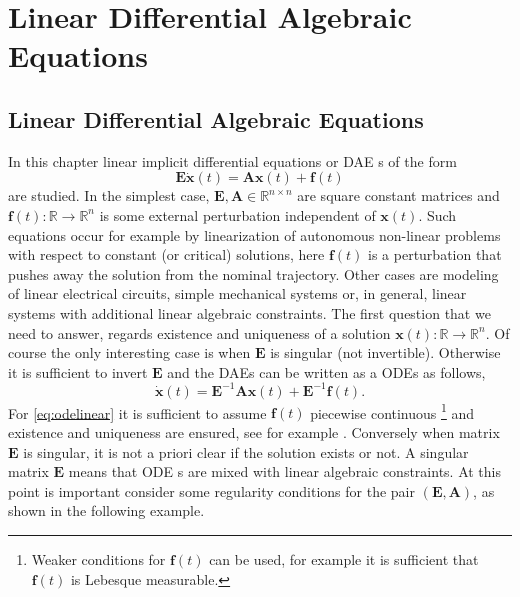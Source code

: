 %
%

\chapter{Linear Differential Algebraic Equations}
	\label{ch:linearDAE}
	\section{Linear Differential Algebraic Equations}
		In this chapter linear implicit differential equations or DAE s of the form
		\begin{equation}
			\label{eq:daelinear}
			\bm{E}\dot{\bm{x}}(t) = \bm{A}\bm{x}(t)+\bm{f}(t)
		\end{equation}
		are studied.
		In the simplest case, $\bm{E},\bm{A}\in\mathbb{R}^{n\times n}$
		are square constant matrices and $\bm{f}(t):\mathbb{R}\rightarrow\mathbb{R}^{n}$
		is some external perturbation independent of $\bm{x}(t)$.
		Such equations occur for example by linearization of autonomous
		non-linear problems with respect to constant (or critical) solutions,
		here $\bm{f}(t)$ is a perturbation that pushes away the solution
		from the nominal trajectory. Other cases are modeling of  linear electrical circuits,
		simple mechanical systems or, in general, 
		linear systems with additional linear algebraic  constraints.
		The first question that we need to answer, regards existence
		and uniqueness of a solution $\bm{x}(t):\mathbb{R}\rightarrow\mathbb{R}^{n}$.
		Of course the only interesting case is when $\bm{E}$ is singular 
		(not invertible).
		Otherwise it is sufficient to invert $\bm{E}$ and the DAEs 
		can be written as a ODEs as follows,
		\begin{equation}
			\label{eq:odelinear}
			\dot{\bm{x}}(t) = \bm{E}^{-1}\bm{A}\bm{x}(t)+\bm{E}^{-1}\bm{f}(t).
		\end{equation}
		For \cref{eq:odelinear} it is sufficient to assume $\bm{f}(t)$ 
		piecewise continuous
		\footnote{Weaker conditions for $\bm{f}(t)$ can be used, 
		for example it is sufficient that $\bm{f}(t)$ is Lebesque measurable.}
		and existence and uniqueness are ensured, see for example \cite{coddington1955theory}.  
		Conversely when matrix $\bm{E}$ is singular, it is not a priori clear 
		if the solution exists or not.
		A singular matrix $\bm{E}$ means that ODE s are mixed with linear 
		algebraic constraints.
		At this point is important consider some regularity conditions
		for the pair $(\bm{E},\bm{A})$, as shown in the following example. 
